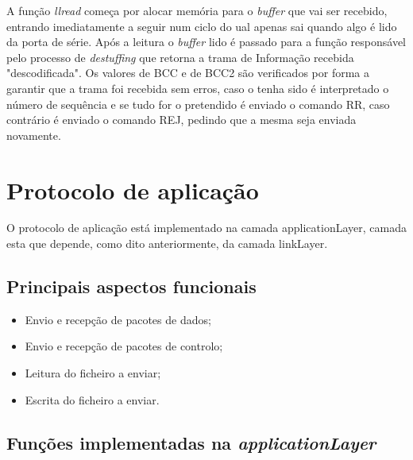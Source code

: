 \documentclass[11pt]{article}
\begin{document}
    A função \textit{llread} começa por alocar memória para o \textit{buffer} que vai ser recebido, entrando imediatamente a seguir num ciclo do ual apenas sai quando algo é lido da porta de série.
	Após a leitura o \textit{buffer} lido é passado para a função responsável pelo processo de \textit{destuffing} que retorna a trama de Informação recebida "descodificada". 
	Os valores de BCC e de BCC2 são verificados por forma a garantir que a trama foi recebida sem erros, caso o tenha sido é interpretado o número de sequência e se tudo for o pretendido é enviado o comando RR, caso contrário é enviado o comando REJ, pedindo que a mesma seja enviada novamente.



\newpage
\section{Protocolo de aplicação}

O protocolo de aplicação está implementado na camada applicationLayer, camada esta que depende, como dito anteriormente, da camada linkLayer.

 \subsection{Principais aspectos funcionais}
 \begin{itemize}
  \item Envio e recepção de pacotes de dados;
  \item Envio e recepção de pacotes de controlo;
  \item Leitura do ficheiro a enviar;
  \item Escrita do ficheiro a enviar.
\end{itemize}
  
  \subsection{Funções implementadas na \textit{applicationLayer}}
\end{document}
